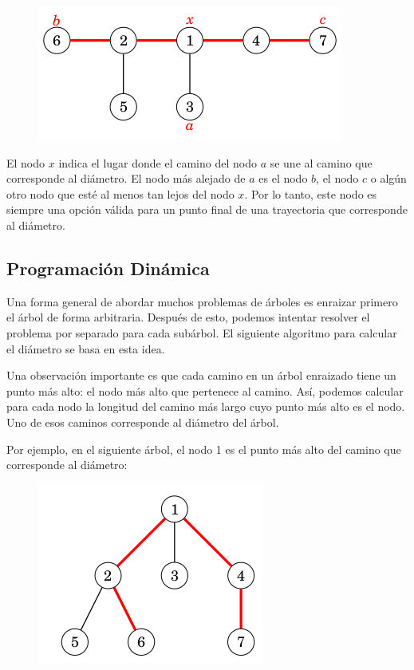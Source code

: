 \begin{figure}[h!]
	\centering
	\includegraphics[width=0.5\linewidth]{img/diameter_tree_4}
	\label{fig:diametertree4}
\end{figure}

El nodo $x$ indica el lugar donde el camino del nodo $a$ se une al camino que corresponde al diámetro. El nodo más alejado de $a$ es el nodo $b$, el nodo $c$ o algún otro nodo que esté al menos tan lejos del nodo $x$. Por lo tanto, este nodo es siempre una opción válida para un punto final de una trayectoria que corresponde al diámetro.

\subsection{Programación Dinámica}

Una forma general de abordar muchos problemas de árboles es enraizar primero el árbol de forma arbitraria. Después de esto, podemos intentar resolver el problema por separado para cada subárbol. El siguiente algoritmo para calcular el diámetro se basa en esta idea.

Una observación importante es que cada camino en un árbol enraizado tiene un punto más alto: el nodo más alto que pertenece al camino. Así, podemos calcular para cada nodo la longitud del camino más largo cuyo punto más alto es el nodo. Uno de esos caminos corresponde al diámetro del árbol.

Por ejemplo, en el siguiente árbol, el nodo 1 es el punto más alto del camino que corresponde al diámetro:

\begin{figure}[h!]
	\centering
	\includegraphics[width=0.5\linewidth]{img/diameter_tree_5}
	\label{fig:diametertree5}
\end{figure}

